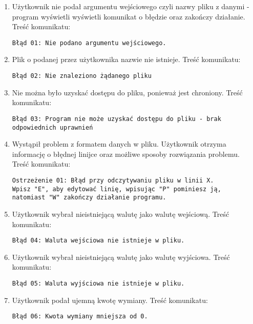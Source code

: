﻿\documentclass{article}
\begin{document}
\begin{enumerate}
\item Użytkownik nie podał argumentu wejściowego czyli nazwy pliku z danymi - program wyświetli wyświetli komunikat o błędzie oraz zakończy działanie. Treść komunikatu: \begin{verbatim}Błąd 01: Nie podano argumentu wejściowego.\end{verbatim}
\item Plik o podanej przez użytkownika nazwie nie istnieje. Treść komunikatu: \begin{verbatim}Błąd 02: Nie znaleziono żądanego pliku\end{verbatim}
\item Nie można było uzyskać dostępu do pliku, ponieważ jest chroniony. Treść komunikatu: \begin{verbatim}Błąd 03: Program nie może uzyskać dostępu do pliku - brak odpowiednich uprawnień\end{verbatim}
\item Wystąpił problem z formatem danych w pliku. Użytkownik otrzyma informację o błędnej linijce oraz możliwe sposoby rozwiązania problemu. Treść komunikatu:\begin{verbatim}Ostrzeżenie 01: Błąd przy odczytywaniu pliku w linii X.
Wpisz "E", aby edytować linię, wpisując "P" pominiesz ją,
natomiast "W" zakończy działanie programu. \end{verbatim}
\item Użytkownik wybrał nieistniejącą walutę jako walutę wejściową. Treść komunikatu:\begin{verbatim}Błąd 04: Waluta wejściowa nie istnieje w pliku.\end{verbatim}
\item Użytkownik wybrał nieistniejącą walutę jako walutę wyjściowa. Treść komunikatu:\begin{verbatim}Błąd 05: Waluta wyjściowa nie istnieje w pliku.\end{verbatim}
\item Użytkownik podał ujemną kwotę wymiany. Treść komunikatu:\begin{verbatim}Błąd 06: Kwota wymiany mniejsza od 0.\end{verbatim}
\end{enumerate}
\end{document}
